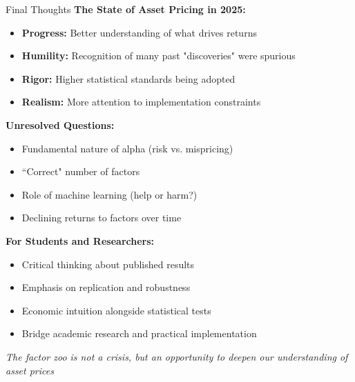 \documentclass{beamer}
\begin{document}
\begin{frame}{Final Thoughts}
    \textbf{The State of Asset Pricing in 2025:}
    
    \begin{itemize}
        \item \textbf{Progress:} Better understanding of what drives returns
        \item \textbf{Humility:} Recognition of many past "discoveries" were spurious
        \item \textbf{Rigor:} Higher statistical standards being adopted
        \item \textbf{Realism:} More attention to implementation constraints
    \end{itemize}
    
    
    \textbf{Unresolved Questions:}
    \begin{itemize}
        \item Fundamental nature of alpha (risk vs. mispricing)
        \item ``Correct" number of factors
        \item Role of machine learning (help or harm?)
        \item Declining returns to factors over time
    \end{itemize}
    
    
    \textbf{For Students and Researchers:}
    \begin{itemize}
        \item Critical thinking about published results
        \item Emphasis on replication and robustness
        \item Economic intuition alongside statistical tests
        \item Bridge academic research and practical implementation
    \end{itemize}
    
    
    \textit{The factor zoo is not a crisis, but an opportunity to deepen our understanding of asset prices}
\end{frame}
\end{document}
